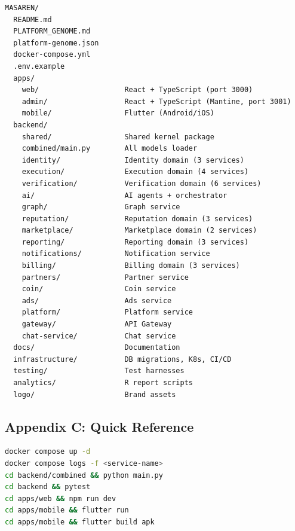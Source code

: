 \documentclass[11pt,a4paper]{article}
\begin{document}
\begin{verbatim}
MASAREN/
  README.md
  PLATFORM_GENOME.md
  platform-genome.json
  docker-compose.yml
  .env.example
  apps/
    web/                    React + TypeScript (port 3000)
    admin/                  React + TypeScript (Mantine, port 3001)
    mobile/                 Flutter (Android/iOS)
  backend/
    shared/                 Shared kernel package
    combined/main.py        All models loader
    identity/               Identity domain (3 services)
    execution/              Execution domain (4 services)
    verification/           Verification domain (6 services)
    ai/                     AI agents + orchestrator
    graph/                  Graph service
    reputation/             Reputation domain (3 services)
    marketplace/            Marketplace domain (2 services)
    reporting/              Reporting domain (3 services)
    notifications/          Notification service
    billing/                Billing domain (3 services)
    partners/               Partner service
    coin/                   Coin service
    ads/                    Ads service
    platform/               Platform service
    gateway/                API Gateway
    chat-service/           Chat service
  docs/                     Documentation
  infrastructure/           DB migrations, K8s, CI/CD
  testing/                  Test harnesses
  analytics/                R report scripts
  logo/                     Brand assets
\end{verbatim}

\subsection{Appendix C: Quick Reference}

\begin{lstlisting}[language=bash, caption=Common Development Commands]
docker compose up -d
docker compose logs -f <service-name>
cd backend/combined && python main.py
cd backend && pytest
cd apps/web && npm run dev
cd apps/mobile && flutter run
cd apps/mobile && flutter build apk
\end{lstlisting}
\end{document}
